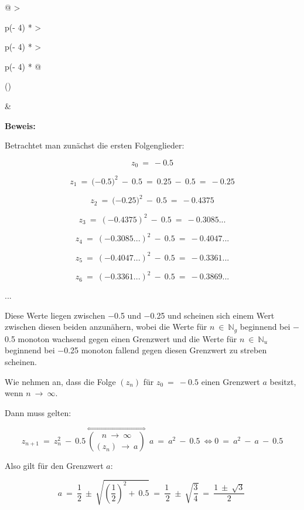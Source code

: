 \documentclass[a4paper, 12pt]{book}
\begin{document}
\begin{longtable}[]{@{}
  >{\raggedright\arraybackslash}p{(\columnwidth - 4\tabcolsep) * }
  >{\raggedright\arraybackslash}p{(\columnwidth - 4\tabcolsep) * }
  >{\raggedright\arraybackslash}p{(\columnwidth - 4\tabcolsep) * }@{}}
\toprule()
\begin{minipage}[b]{\linewidth}\raggedright
\end{minipage} & \begin{minipage}[b]{\linewidth}\raggedright
\textbf{Beweis:}

Betrachtet man zunächst die ersten Folgenglieder:

\[z_{0}\  = \  - 0.5\]

\[z_{1}\  = \ ( - {0.5)}^{2}\  - \ 0.5\  = \ 0.25\  - \ 0.5\  = \  - 0.25\]

\[z_{2}\  = \ ( - {0.25)}^{2}\  - \ 0.5\  = \  - 0.4375\]

\[z_{3}\  = \ {( - 0.4375)}^{2}\  - \ 0.5\  = \  - 0.3085...\]

\[z_{4}\  = \ {( - 0.3085...)}^{2}\  - \ 0.5\  = \  - 0.4047...\]

\[z_{5}\  = \ {( - 0.4047...)}^{2}\  - \ 0.5\  = \  - 0.3361...\]

\[z_{6}\  = \ {( - 0.3361...)}^{2}\  - \ 0.5\  = \  - 0.3869...\]

...

Diese Werte liegen zwischen \(-\)0.5 und \(-\)0.25 und scheinen sich
einem Wert zwischen diesen beiden anzunähern, wobei die Werte für
\(n\  \in \ \mathbb{N}_{g}\) beginnend bei \(-\)0.5 monoton wachsend
gegen einen Grenzwert und die Werte für \(n\  \in \ \mathbb{N}_{u}\)
beginnend bei \(-\)0.25 monoton fallend gegen diesen Grenzwert zu
streben scheinen.

Wie nehmen an, dass die Folge \(\left( z_{n} \right)\) für
\(z_{0}\  = \  - 0.5\) einen Grenzwert \(a\) besitzt, wenn
\(n\  \rightarrow \ \infty\).

Dann muss gelten:

\[z_{n + 1}\  = \ z_{n}^{2}\  - \ 0.5\ \overset{\Leftrightarrow}{\binom{n\  \rightarrow \ \infty}{\left( z_{n} \right)\  \rightarrow \ a}}\ \ a\  = \ a^{2}\  - \ 0.5\  \Longleftrightarrow 0\  = \ a^{2}\  - \ a\  - \ 0.5\]

Also gilt für den Grenzwert \(a\):

\[a\  = \ \frac{1}{2}\  \pm \ \sqrt{\left( \frac{1}{2} \right)^{2} + \ 0.5}\  = \ \frac{1\ }{2}\  \pm \ \sqrt{\frac{3}{4}}\  = \ \frac{1\  \pm \ \sqrt{3}}{2}\ \]


\end{minipage}
\end{longtable}
\end{document}
